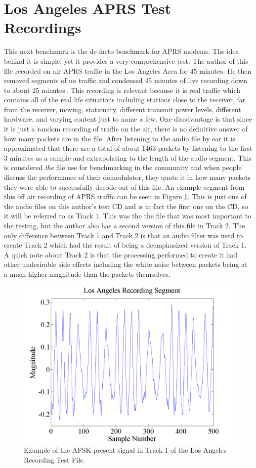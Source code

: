 \section{Los Angeles APRS Test Recordings}
This next benchmark is the de-facto benchmark for APRS modems. The idea behind it is simple, yet it provides a very comprehensive test. The author of this file recorded on air APRS traffic in the Los Angeles Area for 45 minutes. He then removed segments of no traffic and condensed 45 minutes of live recording down to about 25 minutes\,\cite{Smith2009}. This recording is relevant because it is real traffic which contains all of the real life situations including stations close to the receiver, far from the receiver, moving, stationary, different transmit power levels, different hardware, and varying content just to name a few. One disadvantage is that since it is just a random recording of traffic on the air, there is no definitive answer of how many packets are in the file. After listening to the audio file by ear it is approximated that there are a total of about 1463 packets by listening to the first 3 minutes as a sample and extrapolating to the length of the audio segment. This is considered \textit{the} file use for benchmarking in the community and when people discuss the performance of their demodulator, they quote it in how many packets they were able to successfully decode out of this file. An example segment from this off air recording of APRS traffic can be seen in Figure \ref{Track1Segment}. This is just one of the audio files on this author's test CD and is in fact the first one on the CD, so it will be referred to as Track 1. This was the the file that was most important to the testing, but the author also has a second version of this file in Track 2. The only difference between Track 1 and Track 2 is that an audio filter was used to create Track 2 which had the result of being a deemphasized version of Track 1. A quick note about Track 2 is that the processing performed to create it had other undesirable side effects including the white noise between packets being at a much higher magnitude than the packets themselves.
\begin{figure}
  \centering
	\includegraphics[width=0.75\linewidth]{images/LosAngelesRecordingSegment.png} 
	\caption{Example of the AFSK present signal in Track 1 of the Los Angeles Recording Test File.}
   \label{Track1Segment}
\end{figure}
